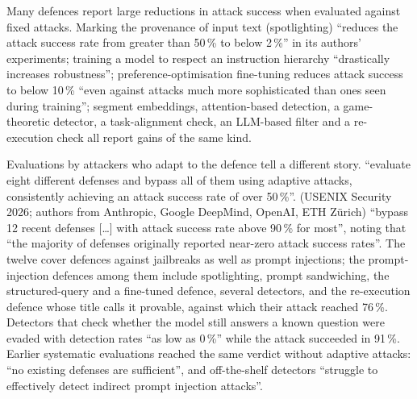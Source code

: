 Many defences report large reductions in attack success when evaluated
against fixed attacks. Marking the provenance of input text
(spotlighting) \enquote{reduces the attack success rate from greater
than 50\,\% to below 2\,\%} in its authors'
experiments\autocite{Hines2024Spotlighting}; training a model to respect
an instruction hierarchy \enquote{drastically increases
robustness}\autocite{Wallace2024Hierarchy}; preference-optimisation
fine-tuning reduces attack success to below 10\,\% \enquote{even against
attacks much more sophisticated than ones seen during
training}\autocite{Chen2025SecAlign}; segment embeddings, attention-based
detection, a game-theoretic detector, a task-alignment check, an
LLM-based filter and a re-execution check all report gains of the same
kind\autocite{Wu2025ISE,Hung2025AttentionTracker,Liu2025DataSentinel,%
Jia2025TaskShield,Shi2025PromptArmor,Zhu2025MELON}.

Evaluations by attackers who adapt to the defence tell a different
story. \textcite{Zhan2025Adaptive} \enquote{evaluate eight different
defenses and bypass all of them using adaptive attacks, consistently
achieving an attack success rate of over 50\,\%}. \textcite{Nasr2026AttackerSecond}
(USENIX Security 2026; authors from Anthropic, Google DeepMind, OpenAI, ETH
Zürich) \enquote{bypass 12 recent defenses [\dots] with attack success
rate above 90\,\% for most}, noting that \enquote{the majority of
defenses originally reported near-zero attack success rates}. The twelve
cover defences against jailbreaks as well as prompt injections; the
prompt-injection defences among them include spotlighting, prompt
sandwiching, the structured-query and a fine-tuned defence, several
detectors, and the re-execution defence whose title calls it provable,
against which their attack reached 76\,\%. Detectors that check whether the model
still answers a known question were evaded with detection rates
\enquote{as low as 0\,\%} while the attack succeeded in
91\,\%\autocite{Choudhary2025NotDetect}. Earlier systematic evaluations
reached the same verdict without adaptive attacks: \enquote{no existing
defenses are sufficient}\autocite{Liu2024Formalizing}, and off-the-shelf
detectors \enquote{struggle to effectively detect indirect prompt
injection attacks}\autocite{Chen2025DetectRemove}.

